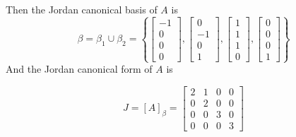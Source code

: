 \begin{homeworkProblem}
Then the Jordan canonical basis of $A$ is \[
  \beta = \beta_1 \cup \beta_2 = \left\{
    \begin{bmatrix}
      -1\\0\\0\\0
    \end{bmatrix}, \begin{bmatrix}
      0\\-1\\0\\1
    \end{bmatrix}, \begin{bmatrix}
      1\\1\\1\\0
    \end{bmatrix}, \begin{bmatrix}
      0\\0\\0\\1
    \end{bmatrix}
  \right\}
\]
And the Jordan canonical form of $A$ is

\[
J = [A]_\beta = \begin{bmatrix}
  2 & 1 & 0 & 0\\
  0 & 2 & 0 & 0 \\
  0 & 0 & 3 & 0 \\
  0 & 0 & 0 & 3
\end{bmatrix}
\]

\end{homeworkProblem}
